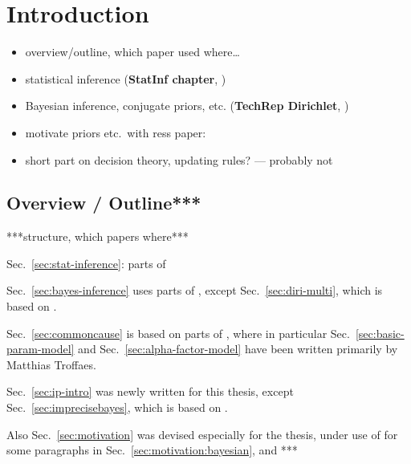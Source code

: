 \chapter{Introduction}


\begin{itemize}
\item overview/outline, which paper used where\ldots
\item statistical inference (\textbf{StatInf chapter}, \cite{itip-statinf})
\item Bayesian inference, conjugate priors, etc. (\textbf{TechRep Dirichlet}, \cite{Walter2012b})
\item motivate priors etc.\ with ress paper: \cite{Troffaes2013a}
\item short part on decision theory, updating rules? --- probably not
\end{itemize}

\section{Overview / Outline***}

***structure, which papers where***

Sec.~\ref{sec:stat-inference}: parts of \cite{itip-statinf}

Sec.~\ref{sec:bayes-inference} uses parts of \cite{itip-statinf},
except Sec.~\ref{sec:diri-multi}, which is based on \cite{Walter2012b}.



Sec.~\ref{sec:commoncause} is based on parts of \cite{Troffaes2013a},
where in particular Sec.~\ref{sec:basic-param-model} and Sec.~\ref{sec:alpha-factor-model}
have been written primarily by Matthias Troffaes.


Sec.~\ref{sec:ip-intro} was newly written for this thesis,
except Sec.~\ref{sec:imprecisebayes}, which is based on \textcite[\S 8.4.2]{itip-statinf}.

Also Sec.~\ref{sec:motivation} was devised especially for the thesis,
under use of \textcite[\S 8.2.3]{itip-statinf} for some paragraphs in
Sec.~\ref{sec:motivation:bayesian}, and ***

